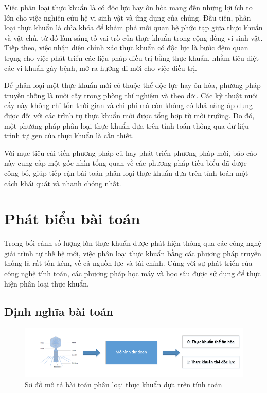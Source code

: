 Việc phân loại thực khuẩn là có độc lực hay ôn hòa mang đến những lợi ích to lớn cho việc nghiên cứu hệ vi sinh vật và ứng dụng của chúng. Đầu tiên, phân loại thực khuẩn là chìa khóa để khám phá mối quan hệ phức tạp giữa thực khuẩn và vật chủ, từ đó làm sáng tỏ vai trò của thực khuẩn trong cộng đồng vi sinh vật. Tiếp theo, việc nhận diện chính xác thực khuẩn có độc lực là bước đệm quan trọng cho việc phát triển các liệu pháp điều trị bằng thực khuẩn, nhằm tiêu diệt các vi khuẩn gây bệnh, mở ra hướng đi mới cho việc điều trị.

Để phân loại một thực khuẩn mới có thuộc thể độc lực hay ôn hòa, phương pháp truyền thống là nuôi cấy trong phòng thí nghiệm và theo dõi. Các kỹ thuật nuôi cấy này không chỉ tốn thời gian và chi phí mà còn không có khả năng áp dụng được đối với các trình tự thực khuẩn mới được tổng hợp từ môi trường. Do đó, một phương pháp phân loại thực khuẩn dựa trên tính toán thông qua dữ liệu trình tự gen của thực khuẩn là cần thiết.

Với mục tiêu cải tiến phương pháp cũ hay phát triển phương pháp mới, báo cáo này cung cấp một góc nhìn tổng quan về các phương pháp tiêu biểu đã được công bố, giúp tiếp cận bài toán phân loại thực khuẩn dựa trên tính toán một cách khái quát và nhanh chóng nhất.

\section{Phát biểu bài toán}

Trong bối cảnh số lượng lớn thực khuẩn được phát hiện thông qua các công nghệ giải trình tự thế hệ mới, việc phân loại thực khuẩn bằng các phương pháp truyền thống là rất tốn kém, về cả nguồn lực và tài chính. Cùng với sự phát triển của công nghệ tính toán, các phương pháp học máy và học sâu được sử dụng để thực hiện phân loại thực khuẩn.

\subsection{Định nghĩa bài toán}
\begin{figure}[H]
    \centering
    \includegraphics[width=1\linewidth]{figures/problem.png}
    \caption{Sơ đồ mô tả bài toán phân loại thực khuẩn dựa trên tính toán}
    \label{fig:problem}
\end{figure}


